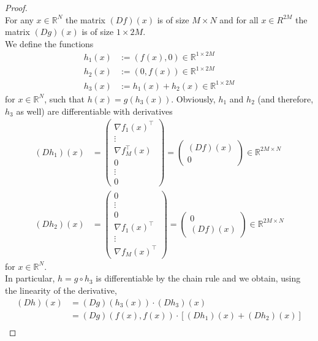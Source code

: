 \documentclass[a4paper, reqno]{amsart}
\newcommand{\R}{\mathbb R}
\theoremstyle{definition}
\numberwithin{equation}{section}
\begin{document}
\begin{proof} \hfill \\
	For any $x \in \R^N$ the matrix $(Df)(x)$ is of size $M \times N$
	and for all $x \in R^{2M}$ the matrix $(Dg)(x)$ is of size $1 \times 2M.$\\
	We define the functions
	\begin{align*}
		h_1(x) & := (f(x), 0) \in \R^{1\times 2M} \\
		h_2(x) & := (0, f(x)) \in \R^{1 \times 2M} \\
		h_3(x) & := h_1(x) + h_2(x) \in \R^{1\times 2M}
	\end{align*}
	for $x \in \R^N$, such that $h(x) = g(h_3(x)).$
	Obviously, $h_1$ and $h_2$ (and therefore, $h_3$ as well) are differentiable with derivatives
	\begin{align*}
		(Dh_1)(x) & = \begin{pmatrix}
			\nabla f_1(x)^\top \\
			\vdots \\
			\nabla f_M^\top(x) \\
			0 \\
			\vdots \\ 
			0
		\end{pmatrix}
		= \begin{pmatrix}
		 (Df)(x) \\ 0
		\end{pmatrix}
		\in \R^{2M \times N} \\
		(Dh_2)(x) & = \begin{pmatrix}
			0 \\
			\vdots \\
			0 \\
			\nabla f_1(x)^\top \\
			\vdots \\
			\nabla f_M(x)^\top
		\end{pmatrix}
		= \begin{pmatrix}
		 0 \\ (Df)(x)
		\end{pmatrix}
		\in \R^{2M \times N}
	\end{align*}
	for $x \in \R^N.$ \\
	In particular, $h = g \circ h_3$ is differentiable by the chain rule and we obtain, using the linearity of the derivative,
	\begin{align*}
		(Dh)(x)
			& = (Dg)(h_3(x)) \cdot (Dh_3)(x) \\
			& = (Dg)(f(x), f(x)) \cdot \left[ (Dh_1)(x) + (Dh_2)(x) \right] \\

\end{align*}
\end{proof}
\end{document}
